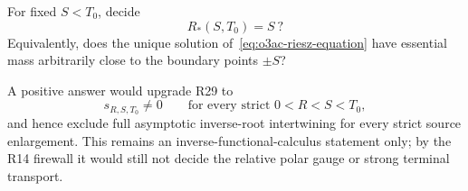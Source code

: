 \begin{openproblem}
\label{open:o3ac-full-support}
For fixed $S<T_0$, decide
\[
 \boxed{R_*(S,T_0)=S\ ?}
\]
Equivalently, does the unique solution of~\eqref{eq:o3ac-riesz-equation} have essential
mass arbitrarily close to the boundary points $\pm S$?

A positive answer would upgrade R29 to
\[
 s_{R,S,T_0}\ne0
 \qquad\text{for every strict }0<R<S<T_0,
\]
and hence exclude full asymptotic inverse-root intertwining for every strict source
enlargement.  This remains an inverse-functional-calculus statement only; by the R14
firewall it would still not decide the relative polar gauge or strong terminal
transport.
\end{openproblem}
